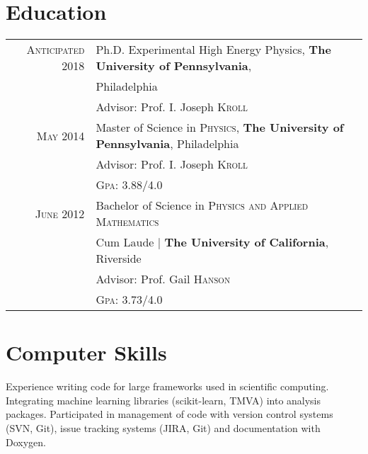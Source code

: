\documentclass[a4paper,10pt]{article} %
\begin{document}
\section{Education}

\begin{tabular}{rl}
\textsc{Anticipated 2018} & Ph.D. Experimental High Energy Physics, \textbf{The University of Pennsylvania}, \\
                          & Philadelphia \\
&\small Advisor: Prof. I. Joseph \textsc{Kroll}\\
\vspace{1mm}


\textsc{May} 2014 & Master of Science in \textsc{Physics}, \textbf{The University of Pennsylvania}, Philadelphia\\
&\small Advisor: Prof. I. Joseph \textsc{Kroll}\\
&\normalsize \textsc{Gpa}: 3.88/4.0\\
\vspace{1mm}


\textsc{June} 2012& Bachelor of Science in \textsc{}\textsc{Physics and Applied Mathematics} \\
&Cum Laude | \normalsize\textbf{The University of California}, Riverside\\
&\small Advisor: Prof. Gail \textsc{Hanson}\\
&\normalsize \textsc{Gpa}: 3.73/4.0 \\

\end{tabular}
\vspace{0mm}


\section{Computer Skills}

Experience writing code for large frameworks used in scientific computing. Integrating
machine learning libraries (scikit-learn, TMVA) into analysis packages. Participated
in management of code with version control systems (SVN, Git), issue tracking systems (JIRA, Git)
and documentation with Doxygen.
\end{document}
